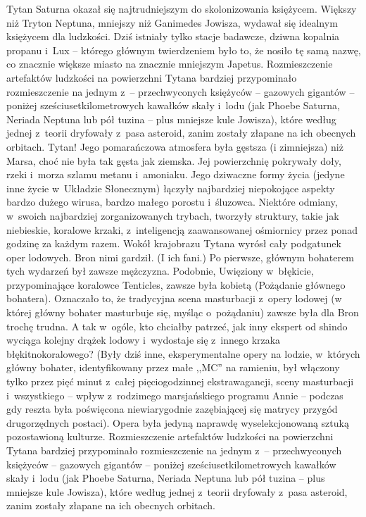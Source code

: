 \documentclass[oneside,polish,11pt,rmheadings]{mwbk}
\begin{document}
Tytan Saturna okazał się najtrudniejszym do skolonizowania księżycem. Większy niż Tryton Neptuna, mniejszy niż Ganimedes Jowisza, wydawał się idealnym księżycem dla ludzkości. Dziś istniały tylko stacje badawcze, dziwna kopalnia propanu i~Lux -- którego głównym twierdzeniem było to, że nosiło tę samą nazwę, co znacznie większe miasto na znacznie mniejszym Japetus. Rozmieszczenie artefaktów ludzkości na powierzchni Tytana bardziej przypominało rozmieszczenie na jednym z~-- przechwyconych księżyców --  gazowych gigantów -- poniżej sześciusetkilometrowych kawałków skały i~lodu (jak Phoebe Saturna, Neriada Neptuna lub pół tuzina -- plus mniejsze kule Jowisza), które według jednej z~teorii dryfowały z~pasa asteroid, zanim zostały złapane na ich obecnych orbitach. Tytan! Jego pomarańczowa atmosfera była gęstsza (i zimniejsza) niż Marsa, choć nie była tak gęsta jak ziemska. Jej powierzchnię pokrywały doły, rzeki i~morza szlamu metanu i~amoniaku. Jego dziwaczne formy życia (jedyne inne życie w~Układzie Słonecznym) łączyły najbardziej niepokojące aspekty bardzo dużego wirusa, bardzo małego porostu i~śluzowca. Niektóre odmiany, w~swoich najbardziej zorganizowanych trybach, tworzyły struktury, takie jak niebieskie, koralowe krzaki, z~inteligencją zaawansowanej ośmiornicy przez ponad godzinę za każdym razem. Wokół krajobrazu Tytana wyrósł cały podgatunek oper lodowych. Bron nimi gardził. (I ich fani.) Po pierwsze, głównym bohaterem tych wydarzeń był zawsze mężczyzna. Podobnie, Uwięziony w~błękicie, przypominające koralowce Tenticles, zawsze była kobietą (Pożądanie głównego bohatera). Oznaczało to, że tradycyjna scena masturbacji z~opery lodowej (w której główny bohater masturbuje się, myśląc o~pożądaniu) zawsze była dla Bron trochę trudna. A tak w~ogóle, kto chciałby patrzeć, jak inny ekspert od shindo wyciąga kolejny drążek lodowy i~wydostaje się z~innego krzaka błękitnokoralowego? (Były dziś inne, eksperymentalne opery na lodzie, w~których główny bohater, identyfikowany przez małe ,,MC'' na ramieniu, był włączony tylko przez pięć minut z~całej pięciogodzinnej ekstrawagancji, sceny masturbacji i~wszystkiego -- wpływ z~rodzimego marsjańskiego programu Annie -- podczas gdy reszta była poświęcona niewiarygodnie zazębiającej się matrycy przygód drugorzędnych postaci). Opera była jedyną naprawdę wyselekcjonowaną sztuką pozostawioną kulturze. Rozmieszczenie artefaktów ludzkości na powierzchni Tytana bardziej przypominało rozmieszczenie na jednym z~-- przechwyconych księżyców --  gazowych gigantów -- poniżej sześciusetkilometrowych kawałków skały i~lodu (jak Phoebe Saturna, Neriada Neptuna lub pół tuzina -- plus mniejsze kule Jowisza), które według jednej z~teorii dryfowały z~pasa asteroid, zanim zostały złapane na ich obecnych orbitach. 
\clearpage 
\end{document}
